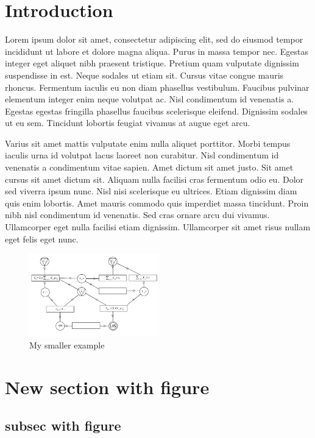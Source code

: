 \documentclass[]{article}
\begin{document}
\section{Introduction}
Lorem ipsum dolor sit amet, consectetur adipiscing elit, sed do eiusmod tempor incididunt ut labore et dolore magna aliqua. Purus in massa tempor nec. Egestas integer eget aliquet nibh praesent tristique. Pretium quam vulputate dignissim suspendisse in est. Neque sodales ut etiam sit. Cursus vitae congue mauris rhoncus. Fermentum iaculis eu non diam phasellus vestibulum. Faucibus pulvinar elementum integer enim neque volutpat ac. Nisl condimentum id venenatis a. Egestas egestas fringilla phasellus faucibus scelerisque eleifend. Dignissim sodales ut eu sem. Tincidunt lobortis feugiat vivamus at augue eget arcu.

Varius sit amet mattis vulputate enim nulla aliquet porttitor. Morbi tempus iaculis urna id volutpat lacus laoreet non curabitur. Nisl condimentum id venenatis a condimentum vitae sapien. Amet dictum sit amet justo. Sit amet cursus sit amet dictum sit. Aliquam nulla facilisi cras fermentum odio eu. Dolor sed viverra ipsum nunc. Nisl nisi scelerisque eu ultrices. Etiam dignissim diam quis enim lobortis. Amet mauris commodo quis imperdiet massa tincidunt. Proin nibh nisl condimentum id venenatis. Sed cras ornare arcu dui vivamus. Ullamcorper eget nulla facilisi etiam dignissim. Ullamcorper sit amet risus nullam eget felis eget nunc.

\begin{figure}[htpb]
    \begin{center}
        \includegraphics[width=0.5\textwidth]{example1.png}   
    \end{center}
    \caption{My smaller example}
    \label{fig_example_small}
\end{figure}

\section{New section with figure}

\subsection{subsec with figure}
\end{document}
